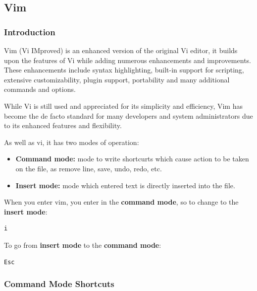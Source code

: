 \documentclass{article}
\newenvironment{codetemplate}[1][]{%
  \mybasecolorbox[#1]
  \itshape
}{%
  \endmybasecolorbox
}
\begin{document}
\subsection{Vim}

\subsubsection{Introduction}

Vim (Vi IMproved) is an enhanced version of the original Vi editor, it builds upon the features of Vi while adding numerous enhancements and improvements. These enhancements include syntax highlighting, built-in support for scripting, extensive customizability, plugin support, portability and many additional commands and options.

While Vi is still used and appreciated for its simplicity and efficiency, Vim has become the de facto standard for many developers and system administrators due to its enhanced features and flexibility.

As well as vi, it has two modes of operation:

\begin{itemize}
    \item \textbf{Command mode:} mode to write shortcurts which cause action to be taken on the file, as remove line, save, undo, redo, etc.
    \item \textbf{Insert mode:} mode which entered text is directly inserted into the file.
\end{itemize}

When you enter vim, you enter in the \textbf{command mode}, so to change to the \textbf{insert mode}:

\begin{codetemplate}{}
\begin{verbatim}
i
\end{verbatim}
\end{codetemplate}

To go from \textbf{insert mode} to the \textbf{command mode}:
\begin{codetemplate}{}
\begin{verbatim}
Esc
\end{verbatim}
\end{codetemplate}

\subsubsection{Command Mode Shortcuts}
\end{document}
